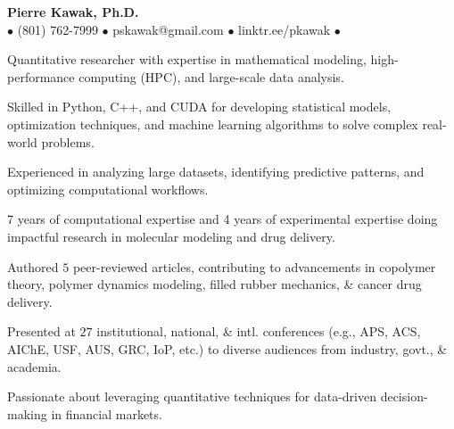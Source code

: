 \begin{center}
  {\LARGE \textbf{Pierre Kawak, Ph.D.} }\\[1ex]
  $\bullet$ (801) 762-7999 $\bullet$ pskawak@gmail.com $\bullet$ linktr.ee/pkawak $\bullet$ \\
\end{center}
\vspace{-0.6cm}
\begin{tabitemize}
  \item Quantitative researcher with expertise in mathematical modeling, high-performance computing (HPC), and large-scale data analysis. 
  \item Skilled in Python, C++, and CUDA for developing statistical models, optimization techniques, and machine learning algorithms to solve complex real-world problems.
  \item Experienced in analyzing large datasets, identifying predictive patterns, and optimizing computational workflows.
  \item 7 years of computational expertise and 4 years of experimental expertise doing impactful research in molecular modeling and drug delivery.
  \item Authored $5$ peer-reviewed articles, contributing to advancements in copolymer theory, polymer dynamics modeling, filled rubber mechanics, \& cancer drug delivery.
  \item Presented at $27$ institutional, national, \& intl. conferences (e.g., APS, ACS, AIChE, USF, AUS, GRC, IoP, etc.) to diverse audiences from industry, govt., \& academia.
  \item Passionate about leveraging quantitative techniques for data-driven decision-making in financial markets.
\end{tabitemize}
\vspace{-2.0\baselineskip}

